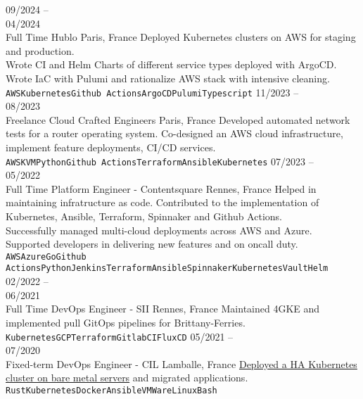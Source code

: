 \documentclass[10pt]{developercv} %
\begin{document}
\begin{entrylist}
	\entry
		{09/2024 --\\04/2024\\\footnotesize{Full Time}}
		{Hublo}
		{Paris, France}
		{Deployed Kubernetes clusters on AWS for staging and production.\\
		Wrote CI and Helm Charts of different service types deployed with ArgoCD.\\
		Wrote IaC with Pulumi and rationalize AWS stack with intensive cleaning.\\
		\texttt{AWS}\slashsep\texttt{Kubernetes}\slashsep\texttt{Github Actions}\slashsep\texttt{ArgoCD}\slashsep\texttt{Pulumi}\slashsep\texttt{Typescript}}
	\entry
		{11/2023 --\\08/2023\\\footnotesize{Freelance}}
		{Cloud Crafted Engineers}
		{Paris, France}
		{Developed automated network tests for a router operating system.
		Co-designed an AWS cloud infrastructure, implement feature deployments, CI/CD services.\\
		\texttt{AWS}\slashsep\texttt{KVM}\slashsep\texttt{Python}\slashsep\texttt{Github Actions}\slashsep\texttt{Terraform}\slashsep\texttt{Ansible}\slashsep\texttt{Kubernetes}}
	\entry
		{07/2023 --\\05/2022\\\footnotesize{Full Time}}
		{Platform Engineer - Contentsquare}
		{Rennes, France}
		{Helped in maintaining infratructure as code. Contributed to the implementation of Kubernetes, Ansible, Terraform, Spinnaker and Github Actions.\\
		Successfully managed multi-cloud deployments across AWS and Azure.\\
		Supported developers in delivering new features and on oncall duty.\\
		\texttt{AWS}\slashsep\texttt{Azure}\slashsep\texttt{Go}\slashsep\texttt{Github Actions}\slashsep\texttt{Python}\slashsep\texttt{Jenkins}\slashsep\texttt{Terraform}\slashsep\texttt{Ansible}\slashsep\texttt{Spinnaker}\slashsep\texttt{Kubernetes}\slashsep\texttt{Vault}\slashsep\texttt{Helm}}
	\entry
		{02/2022 --\\06/2021\\\footnotesize{Full Time}}
		{DevOps Engineer - SII}
		{Rennes, France}
		{Maintained 4GKE and implemented pull GitOps pipelines for Brittany-Ferries.\\
		\texttt{Kubernetes}\slashsep\texttt{GCP}\slashsep\texttt{Terraform}\slashsep\texttt{GitlabCI}\slashsep\texttt{FluxCD}}
	\entry
		{05/2021 --\\07/2020\\\footnotesize{Fixed-term}}
		{DevOps Engineer - CIL}
		{Lamballe, France}
		{\href{https://github.com/Ant0wan/VMWare-Kubenetes-cluster}{Deployed a HA Kubernetes cluster on bare metal servers} and migrated applications.\\
		\texttt{Rust}\slashsep\texttt{Kubernetes}\slashsep\texttt{Docker}\slashsep\texttt{Ansible}\slashsep\texttt{VMWare}\slashsep\texttt{Linux}\slashsep\texttt{Bash}}
\end{entrylist}
\end{document}
